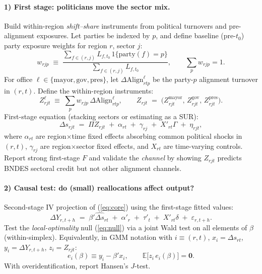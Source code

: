 \documentclass{article}
\begin{document}
\paragraph{1) First stage: politicians move the sector mix.}
Build within-region \emph{shift–share} instruments from political turnovers and pre-alignment exposures.
Let parties be indexed by $p$, and define baseline (pre-$t_0$) party exposure weights for region $r$, sector $j$:
\begin{equation}
    \label{eq:weights}
    w_{rjp} \;\equiv\; \frac{\sum_{f \in (r,j)} L_{f,t_0}\, 1\{\text{party}(f)=p\}}{\sum_{f \in (r,j)} L_{f,t_0}},
    \qquad \sum_p w_{rjp}=1.
\end{equation}
For office $\ell \in \{\text{mayor},\text{gov},\text{pres}\}$, let $\Delta \mathrm{Align}^{\ell}_{rtp}$ be the party-$p$ alignment turnover in $(r,t)$.
Define the within-region instruments:
\begin{equation}
    \label{eq:ssiv}
    Z^{\ell}_{rjt} \;\equiv\; \sum_{p} w_{rjp}\, \Delta \mathrm{Align}^{\ell}_{rtp},
    \qquad
    Z_{rjt} \;=\; \big(Z^{\text{mayor}}_{rjt},\, Z^{\text{gov}}_{rjt},\, Z^{\text{pres}}_{rjt}\big).
\end{equation}
First-stage equation (stacking sectors or estimating as a SUR):
\begin{equation}
    \label{eq:firststage}
    \Delta s_{rjt} \;=\; \Pi Z_{rjt} \;+\; \alpha_{rt} \;+\; \gamma_{rj} \;+\; X'_{rt}\Gamma \;+\; \eta_{rjt},
\end{equation}
where $\alpha_{rt}$ are region$\times$time fixed effects absorbing common political shocks in $(r,t)$,
$\gamma_{rj}$ are region$\times$sector fixed effects, and $X_{rt}$ are time-varying controls.
Report strong first-stage $F$ and validate the \emph{channel} by showing $Z_{rjt}$ predicts BNDES sectoral credit but not other alignment channels.

\paragraph{2) Causal test: do (small) reallocations affect output?}
Second-stage IV projection of (\ref{eq:core}) using the first-stage fitted values:
\begin{equation}
    \label{eq:secondstage}
    \Delta Y_{r,t+h} \;=\; \beta' \widehat{\Delta s}_{rt} \;+\; \alpha'_{r} \;+\; \tau'_{t} \;+\; X'_{rt}\delta \;+\; \varepsilon_{r,t+h}.
\end{equation}
Test the \emph{local-optimality} null (\ref{eq:null}) via a joint Wald test on all elements of $\beta$ (within-simplex).
Equivalently, in GMM notation with $i\equiv(r,t)$, $x_i=\Delta s_{rt}$, $y_i=\Delta Y_{r,t+h}$, $z_i=Z_{rjt}$:
\begin{equation}
    \label{eq:gmm}
    e_i(\beta) \equiv y_i - \beta' x_i,
    \qquad
    \mathbb{E}\big[z_i\, e_i(\beta)\big] = \mathbf{0}.
\end{equation}
With overidentification, report Hansen's $J$-test.
\end{document}
